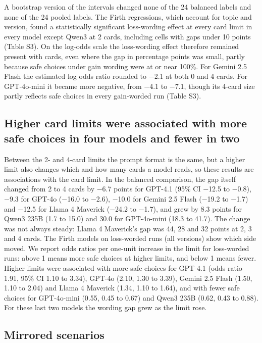 \documentclass[11pt]{article}
\begin{document}
A bootstrap version of the intervals changed none of the 24 balanced labels and none of the 24 pooled labels. The Firth regressions, which account for topic and version, found a statistically significant loss-wording effect at every card limit in every model except Qwen3 at 2 cards, including cells with gaps under 10 points (Table S3). On the log-odds scale the loss-wording effect therefore remained present with cards, even where the gap in percentage points was small, partly because safe choices under gain wording were at or near 100\%. For Gemini 2.5 Flash the estimated log odds ratio rounded to $-$2.1 at both 0 and 4 cards. For GPT-4o-mini it became more negative, from $-$4.1 to $-$7.1, though its 4-card size partly reflects safe choices in every gain-worded run (Table S3).

\subsection{Higher card limits were associated with more safe choices in four models and fewer in two}

Between the 2- and 4-card limits the prompt format is the same, but a higher limit also changes which and how many cards a model reads, so these results are associations with the card limit. In the balanced comparison, the gap itself changed from 2 to 4 cards by $-$6.7 points for GPT-4.1 (95\% CI $-$12.5 to $-$0.8), $-$9.3 for GPT-4o ($-$16.0 to $-$2.6), $-$10.0 for Gemini 2.5 Flash ($-$19.2 to $-$1.7) and $-$12.5 for Llama 4 Maverick ($-$24.2 to $-$1.7), and grew by 8.3 points for Qwen3 235B (1.7 to 15.0) and 30.0 for GPT-4o-mini (18.3 to 41.7). The change was not always steady: Llama 4 Maverick's gap was 44, 28 and 32 points at 2, 3 and 4 cards. The Firth models on loss-worded runs (all versions) show which side moved. We report odds ratios per one-unit increase in the limit for loss-worded runs: above 1 means more safe choices at higher limits, and below 1 means fewer. Higher limits were associated with more safe choices for GPT-4.1 (odds ratio 1.91, 95\% CI 1.10 to 3.34), GPT-4o (2.10, 1.30 to 3.39), Gemini 2.5 Flash (1.50, 1.10 to 2.04) and Llama 4 Maverick (1.34, 1.10 to 1.64), and with fewer safe choices for GPT-4o-mini (0.55, 0.45 to 0.67) and Qwen3 235B (0.62, 0.43 to 0.88). For these last two models the wording gap grew as the limit rose.

\subsection{Mirrored scenarios}
\end{document}
